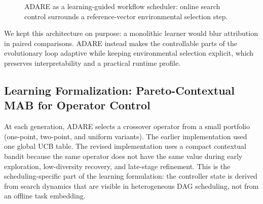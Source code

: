 \documentclass[preprint,12pt]{elsarticle}
\begin{document}
\begin{figure}[t]
\centering
{}
\caption{ADARE as a learning-guided workflow scheduler: online search control surrounds a reference-vector environmental selection step.}
\label{fig:adare_structure}
\end{figure}

We kept this architecture on purpose: a monolithic learner would blur attribution in paired comparisons. ADARE instead makes the controllable parts of the evolutionary loop adaptive while keeping environmental selection explicit, which preserves interpretability and a practical runtime profile.

\subsection{Learning Formalization: Pareto-Contextual MAB for Operator Control}
\label{sec:mab}
At each generation, ADARE selects a crossover operator from a small portfolio (one-point, two-point, and uniform variants). The earlier implementation used one global UCB table. The revised implementation uses a compact contextual bandit because the same operator does not have the same value during early exploration, low-diversity recovery, and late-stage refinement. This is the scheduling-specific part of the learning formulation: the controller state is derived from search dynamics that are visible in heterogeneous DAG scheduling, not from an offline task embedding.
\end{document}
